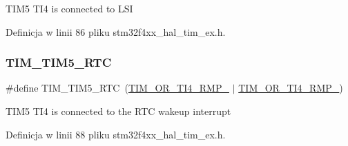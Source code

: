 T\+I\+M5 T\+I4 is connected to L\+SI 

Definicja w linii 86 pliku stm32f4xx\+\_\+hal\+\_\+tim\+\_\+ex.\+h.

\mbox{\label{group___t_i_m_ex___remap_ga93e312581ffb28601b36b4f8b240df79}} 
\subsubsection{\texorpdfstring{T\+I\+M\+\_\+\+T\+I\+M5\+\_\+\+R\+TC}{TIM\_TIM5\_RTC}}
{\footnotesize\ttfamily \#define T\+I\+M\+\_\+\+T\+I\+M5\+\_\+\+R\+TC~(\hyperlink{group___peripheral___registers___bits___definition_gaa2a46aa18f15f2074b93233a18e85629}{T\+I\+M\+\_\+\+O\+R\+\_\+\+T\+I4\+\_\+\+R\+M\+P\+\_} $\vert$ \hyperlink{group___peripheral___registers___bits___definition_ga9aea4f8a0abedbf08bb1e686933c1120}{T\+I\+M\+\_\+\+O\+R\+\_\+\+T\+I4\+\_\+\+R\+M\+P\+\_})}

T\+I\+M5 T\+I4 is connected to the R\+TC wakeup interrupt 

Definicja w linii 88 pliku stm32f4xx\+\_\+hal\+\_\+tim\+\_\+ex.\+h.

